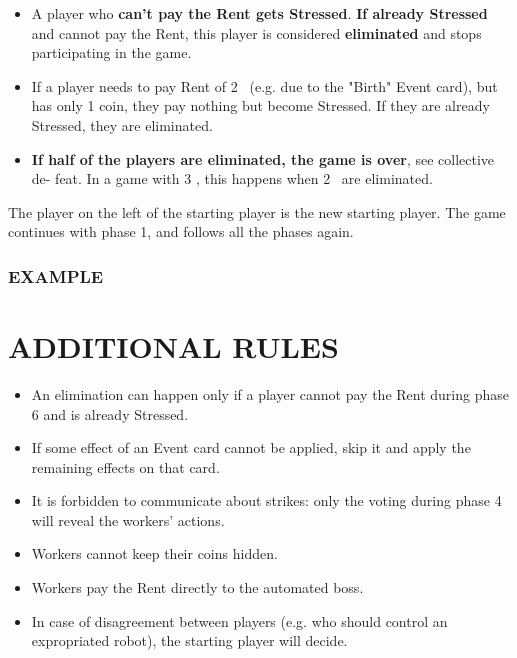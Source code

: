         \begin{itemize}
            \item A player who \textbf{can't pay the Rent gets Stressed}. \textbf{If already Stressed} and
            cannot pay the Rent, this player is considered \textbf{eliminated} and stops participating in the game.
            \item If a player needs to pay Rent of 2 \faRubleSign\ (e.g. due to the "Birth" Event card), but
            has only 1 coin, they pay nothing but become Stressed. If they are already
            Stressed, they are eliminated.
            \item \textbf{If half of the players are eliminated, the game is over}, see collective de-
            feat. In a game with 3 \faPeopleGroup, this happens when 2 \faPeopleGroup\ are eliminated.
        \end{itemize}
        The player on the left of the starting player is the new starting player. The game
        continues with phase 1, and follows all the phases again.


        \subsubsection{EXAMPLE}




\section{ADDITIONAL RULES}

    \begin{itemize}
        \item An elimination can happen only if a player cannot pay the Rent during phase
        6 and is already Stressed.
        \item If some effect of an Event card cannot be applied, skip it and apply the remaining
        effects on that card.
        \item It is forbidden to communicate about strikes: only the voting during phase 4
        will reveal the workers' actions.
        \item Workers cannot keep their coins hidden.
        \item Workers pay the Rent directly to the automated boss.
        \item In case of disagreement between players (e.g. who should control an expropriated
        robot), the starting player will decide.
    \end{itemize}



